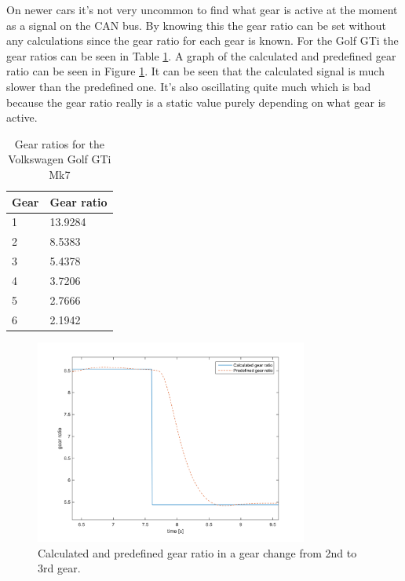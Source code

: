 On newer cars it's not very uncommon to find what gear is active at the moment as a signal on the CAN bus. By knowing this the gear ratio can be set without any calculations since the gear ratio for each gear is known. For the Golf GTi the gear ratios can be seen in Table \ref{tab:gr}. A graph of the calculated and predefined gear ratio can be seen in Figure \ref{gear_ratio}. It can be seen that the calculated signal is much slower than the predefined one. It's also oscillating quite much which is bad because the gear ratio really is a static value purely depending on what gear is active. 


\begin{table}[position specifier]
	\centering
	\begin{tabular}{| l | l |}
		\hline
		Gear & Gear ratio \\ \hline
		1 & 13.9284 \\ \hline
		2 & 8.5383 \\ \hline
		3 & 5.4378 \\ \hline
		4 & 3.7206 \\ \hline
		5 & 2.7666 \\ \hline
		6 & 2.1942 \\ \hline
	\end{tabular}
	\caption{Gear ratios for the Volkswagen Golf GTi Mk7}
	\label{tab:gr}
\end{table}

\begin{figure}[h]
	\centering
	\includegraphics[width=0.8\textwidth]{Pictures/gear_ratio}
	\caption{Calculated and predefined gear ratio in a gear change from 2nd to 3rd gear.}
	\label{gear_ratio}
\end{figure}

\cite{mason}

